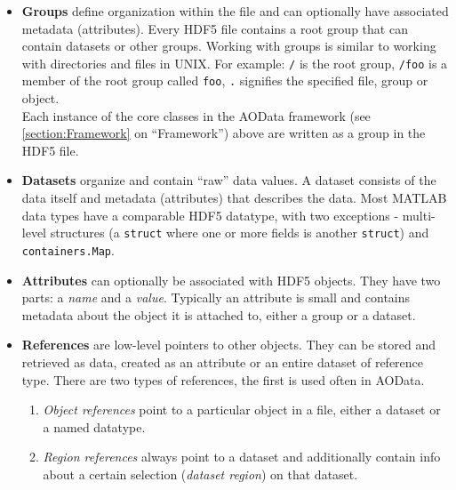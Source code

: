 \documentclass[10pt]{exam}
\newcommand\myurl[1]{\textcolor{blue}{\underline{#1}}}
\newcommand\aodclass[1]{\textcolor{codeblue}{\texttt{#1}}}
\begin{document}
			\begin{itemize}
				\item \textbf{Groups} define organization within the file and can optionally have associated metadata (attributes). Every HDF5 file contains a root group that can contain datasets or other groups. Working with groups is similar to working with directories and files in UNIX. For example: \texttt{/} is the root group, \texttt{/foo} is a member of the root group called \texttt{foo}, \texttt{.} signifies the specified file, group or object.\\
			Each instance of the core classes in the AOData framework (see \myurl{\ref{section:Framework}} on ``Framework'') above are written as a group in the HDF5 file. 
				\item \textbf{Datasets} organize and contain ``raw'' data values. A dataset consists of the data itself and metadata (attributes) that describes the data. Most MATLAB data types have a comparable HDF5 datatype, with two exceptions - multi-level structures (a \aodclass{struct} where one or more fields is another \aodclass{struct}) and \aodclass{containers.Map}. 
				\item \textbf{Attributes} can optionally be associated with HDF5 objects. They have two parts: a \textit{name} and a \textit{value}. Typically an attribute is small and contains metadata about the object it is attached to, either a group or a dataset. 
				\item \textbf{References} are low-level pointers to other objects. They can be stored and retrieved as data, created as an attribute or an entire dataset of reference type. 
				There are two types of references, the first is used often in AOData.
				\begin{enumerate}
					\item \textit{Object references} point to a particular object in a file, either a dataset or a named datatype. 
					\item \textit{Region references} always point to a dataset and additionally contain info about a certain selection (\textit{dataset region}) on that dataset. %
				\end{enumerate}
			\end{itemize}
\end{document}

